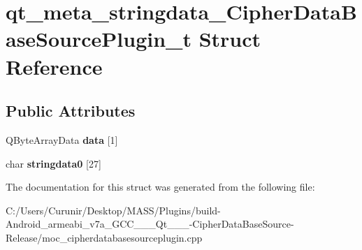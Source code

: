 \hypertarget{structqt__meta__stringdata___cipher_data_base_source_plugin__t}{}\section{qt\+\_\+meta\+\_\+stringdata\+\_\+\+Cipher\+Data\+Base\+Source\+Plugin\+\_\+t Struct Reference}
\label{structqt__meta__stringdata___cipher_data_base_source_plugin__t}
\subsection*{Public Attributes}
\begin{DoxyCompactItemize}
\item 
\mbox{\label{structqt__meta__stringdata___cipher_data_base_source_plugin__t_a7ae6ba26e23c7fea5a488179d5a81387}} 
Q\+Byte\+Array\+Data {\bfseries data} \mbox{[}1\mbox{]}
\item 
\mbox{\label{structqt__meta__stringdata___cipher_data_base_source_plugin__t_a8457ed4231588bc288606af704e393cc}} 
char {\bfseries stringdata0} \mbox{[}27\mbox{]}
\end{DoxyCompactItemize}


The documentation for this struct was generated from the following file\+:\begin{DoxyCompactItemize}
\item 
C\+:/\+Users/\+Curunir/\+Desktop/\+M\+A\+S\+S/\+Plugins/build-\/\+Android\+\_\+armeabi\+\_\+v7a\+\_\+\+G\+C\+C\+\_\+\_\+\_\+\+Qt\+\_\+\_\+\_-\/\+Cipher\+Data\+Base\+Source-\/\+Release/moc\+\_\+cipherdatabasesourceplugin.\+cpp\end{DoxyCompactItemize}
